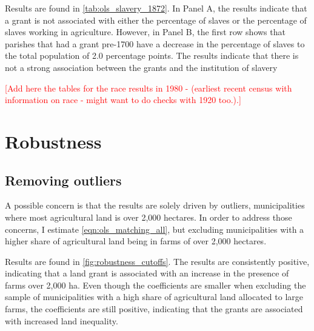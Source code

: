 \documentclass[11pt]{article}
\newcommand{\red}[1]{\textcolor{red}{#1}}
\begin{document}
Results are found in \autoref{tab:ols_slavery_1872}.
In Panel A, the results indicate that a grant is not associated with either the percentage of slaves or the percentage of slaves working in agriculture. 
However, in Panel B, the first row shows that parishes that had a grant pre-1700 have a decrease in the percentage of slaves to the total population of 2.0 percentage points. 
The results indicate that there is not a strong association between the grants and the institution of slavery 

\red{[Add here the tables for the race results in 1980 - (earliest recent census with information on race - might want to do checks with 1920 too.).]}

\begin{comment}
\subsection{Effects on Distribution}

\red{Add here how the gini was estimated.}
\end{comment}


\section{Robustness}
\label{sec:robustness}
\subsection{Removing outliers}

A possible concern is that the results are solely driven by outliers, municipalities where most agricultural land is over 2,000 hectares. 
In order to address those concerns, I estimate \autoref{eqn:ols_matching_all}, but excluding municipalities with a higher share of agricultural land being in farms of over 2,000 hectares.

Results are found in \autoref{fig:robustness_cutoffs}. 
The results are consistently positive, indicating that a land grant is associated with an increase in the presence of farms over 2,000 ha. 
Even though the coefficients are smaller when excluding the sample of municipalities with a high share of agricultural land allocated to large farms, the coefficients are still positive, indicating that the grants are associated with increased land inequality.
\end{document}
